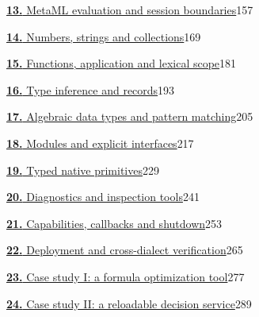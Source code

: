 \noindent\hyperref[ch:13]{\textbf{13.} MetaML evaluation and session boundaries}\hfill 157\par\medskip
\noindent\hyperref[ch:14]{\textbf{14.} Numbers, strings and collections}\hfill 169\par\medskip
\noindent\hyperref[ch:15]{\textbf{15.} Functions, application and lexical scope}\hfill 181\par\medskip
\noindent\hyperref[ch:16]{\textbf{16.} Type inference and records}\hfill 193\par\medskip
\noindent\hyperref[ch:17]{\textbf{17.} Algebraic data types and pattern matching}\hfill 205\par\medskip
\noindent\hyperref[ch:18]{\textbf{18.} Modules and explicit interfaces}\hfill 217\par\medskip
\noindent\hyperref[ch:19]{\textbf{19.} Typed native primitives}\hfill 229\par\medskip
\noindent\hyperref[ch:20]{\textbf{20.} Diagnostics and inspection tools}\hfill 241\par\medskip
\noindent\hyperref[ch:21]{\textbf{21.} Capabilities, callbacks and shutdown}\hfill 253\par\medskip
\noindent\hyperref[ch:22]{\textbf{22.} Deployment and cross-dialect verification}\hfill 265\par\medskip
\noindent\hyperref[ch:23]{\textbf{23.} Case study I: a formula optimization tool}\hfill 277\par\medskip
\noindent\hyperref[ch:24]{\textbf{24.} Case study II: a reloadable decision service}\hfill 289\par\medskip
